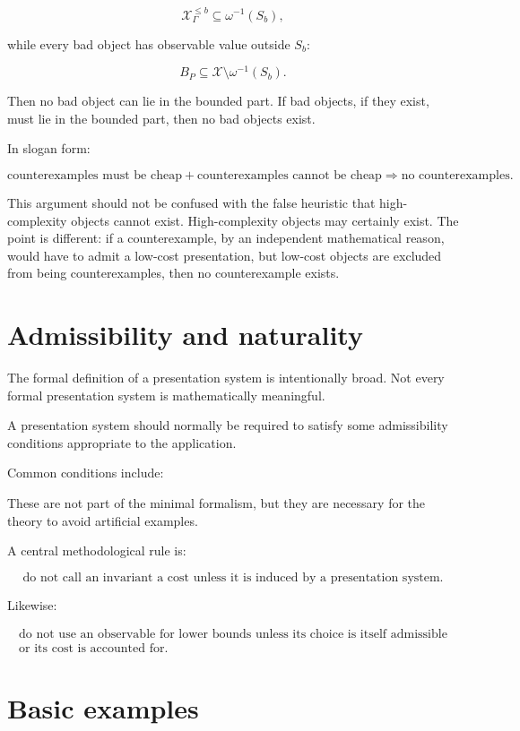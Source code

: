 \documentclass[11pt]{article}
\begin{document}
\[
\mathcal X_\Gamma^{\leq b}\subseteq \omega^{-1}(S_b),
\]

while every bad object has observable value outside \(S_b\):

\[
B_P\subseteq \mathcal X\setminus \omega^{-1}(S_b).
\]

Then no bad object can lie in the bounded part. If bad objects, if they exist, must lie in the bounded part, then no bad objects exist.

In slogan form:

\[
\text{counterexamples must be cheap}
+
\text{counterexamples cannot be cheap}
\Rightarrow
\text{no counterexamples}.
\]

This argument should not be confused with the false heuristic that high-complexity objects cannot exist. High-complexity objects may certainly exist. The point is different: if a counterexample, by an independent mathematical reason, would have to admit a low-cost presentation, but low-cost objects are excluded from being counterexamples, then no counterexample exists.


\section{Admissibility and naturality}

The formal definition of a presentation system is intentionally broad. Not every formal presentation system is mathematically meaningful.

A presentation system should normally be required to satisfy some admissibility conditions appropriate to the application.

Common conditions include:

These are not part of the minimal formalism, but they are necessary for the theory to avoid artificial examples.

A central methodological rule is:

\[
\text{do not call an invariant a cost unless it is induced by a presentation system.}
\]

Likewise:

\[
\begin{gathered}
\text{do not use an observable for lower bounds unless its choice is itself admissible}\\
\text{or its cost is accounted for.}
\end{gathered}
\]


\section{Basic examples}
\end{document}
